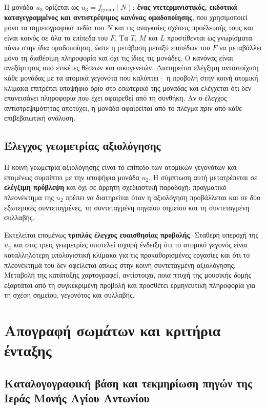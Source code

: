 \documentclass[11pt,a4paper]{article}
\begin{document}
Η μονάδα \(u_3\) ορίζεται ως \(u_3=f_{\mathrm{group}}(N)\): \textbf{ένας ντετερμινιστικός, εκδοτικά καταγεγραμμένος και αντιστρέψιμος κανόνας ομαδοποίησης}, που χρησιμοποιεί μόνο τα σημειογραφικά πεδία του \(N\) και τις αναγκαίες σχέσεις προέλευσής τους και είναι κοινός σε όλα τα επίπεδα του \(F\). Τα \(T\), \(M\) και \(L\) προστίθενται ως γνωρίσματα πάνω στην ίδια ομαδοποίηση, ώστε η μετάβαση μεταξύ επιπέδων του \(F\) να μεταβάλλει μόνο τη διαθέσιμη πληροφορία και όχι τις ίδιες τις μονάδες. Ο κανόνας είναι ανεξάρτητος από ετικέτες θέσεων και οικογενειών. Διατηρείται ελέγξιμη αντιστοίχιση κάθε μονάδας με τα ατομικά γεγονότα που καλύπτει· η προβολή στην κοινή ατομική κλίμακα επιτρέπει υποψήφιο όριο στο εσωτερικό της μονάδας και ελέγχεται ότι δεν επανεισάγει πληροφορία που έχει αφαιρεθεί από τη συνθήκη. Αν ο έλεγχος αντιστρεψιμότητας αποτύχει, η μονάδα αφαιρείται από το πλέγμα \emph{πριν} από κάθε επιβεβαιωτική ανάλυση.

\subsection{Έλεγχος γεωμετρίας αξιολόγησης}\label{app:repr-geometry}

Η κοινή γεωμετρία αξιολόγησης είναι το επίπεδο των ατομικών γεγονότων και επομένως συμπίπτει με την υποψήφια μονάδα \(u_2\). Η σύμπτωση αυτή μετατρέπεται σε \textbf{ελέγξιμη πρόβλεψη} και όχι σε άρρητη σχεδιαστική παραδοχή: πραγματικό πλεονέκτημα της \(u_2\) πρέπει να διατηρείται όταν η αξιολόγηση προβάλλεται και σε δύο εξωτερικές συντεταγμένες, τη συντεταγμένη πηγαίου σημείου και τη συντεταγμένη συλλαβής.

Εκτελείται επομένως \textbf{τριπλός έλεγχος ευαισθησίας προβολής}. Σταθερή υπεροχή της \(u_2\) και στις τρεις γεωμετρίες αποτελεί ισχυρή ένδειξη ότι το ατομικό γεγονός είναι καταλληλότερη υπολογιστική κλίμακα για τις προκαθορισμένες εργασίες και ότι το πλεονέκτημά του δεν οφείλεται απλώς στην κοινή συντεταγμένη αξιολόγησης. Μεταβολή της κατάταξης χαρτογραφεί, αντίστοιχα, ποια πτυχή της μουσικής δομής εξαρτάται από τη συγκεκριμένη προβολή και προσθέτει ερμηνευτική πληροφορία για τη σχέση σημείου, γεγονότος και συλλαβής.



\section{Απογραφή σωμάτων και κριτήρια ένταξης}\label{app:corpora}

\subsection{Καταλογογραφική βάση και τεκμηρίωση πηγών της Ιεράς Μονής Αγίου Αντωνίου}\label{sec:sta}\label{app:corpora-sta}
\end{document}
